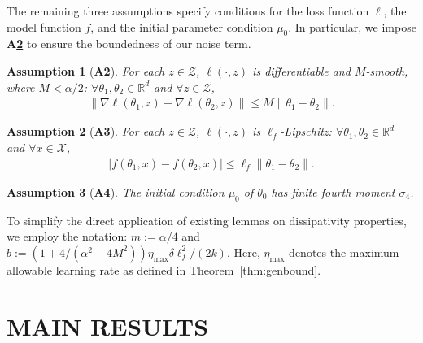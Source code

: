 \documentclass{article}
\newcommand{\norm}[1]{\left\lVert#1\right\rVert} %
\newtheorem{remark}{Remark}
\newtheorem{assumption}{Assumption}
\begin{document}
\iffalse
\begin{remark}[Strong convexity in label noise SGD]
    In label noise SGD, the common setup of strongly convex loss and Lipschitz continuous model function implies the uniform dissipativity of the diffusion process. Without uniformity in dissipativity, this implication is limited to the origin.
\end{remark}
\fi
The remaining three assumptions specify conditions for the loss function $\ell$, the model function $f$, and the initial parameter condition $\mu_0$. In particular, we impose \textbf{A\ref{ass:lips}} to ensure the boundedness of our noise term.

\begin{assumption}[\textbf{A2}]\label{ass:smooth}
    For each $z \in \mathcal{Z}$, $\ell(\cdot, z)$ is differentiable and \textit{$M$-smooth}, where $M < \alpha /2$: $\forall \theta_1, \theta_2 \in \mathbb{R}^d$ and $\forall z\in \mathcal{Z}$,
    \begin{align*}
        \norm{\nabla \ell (\theta_1, z) - \nabla \ell(\theta_2, z)} \leq M \norm{\theta_1 - \theta_2}.
    \end{align*}
\end{assumption}

\begin{assumption}[\textbf{A3}]\label{ass:lips}
    For each $z \in \mathcal{Z}$, $\ell(\cdot, z)$ is \textit{$\ell_f$-Lipschitz}: $\forall \theta_1, \theta_2 \in \mathbb{R}^d$ and $\forall x \in \mathcal{X}$,
    \begin{align*}
        |f(\theta_1, x) - f(\theta_2, x)| \leq \ell_f \norm{\theta_1 - \theta_2}.
    \end{align*}
\end{assumption}

\begin{assumption}[\textbf{A4}]\label{ass:moment}
    The initial condition $\mu_0$ of $\theta_0$ has finite fourth moment $\sigma_4$.
\end{assumption}

To simplify the direct application of existing lemmas on dissipativity properties, we employ the notation: $m := \alpha/4$ and $b := \left(1 + 4/(\alpha^2 - 4M^2) \right) \eta_{\max} \delta \ell_f^2 /(2k)$. Here, $\eta_{\max}$ denotes the maximum allowable learning rate as defined in Theorem~\ref{thm:genbound}.

\section{MAIN RESULTS}\label{chapter3}
\end{document}
